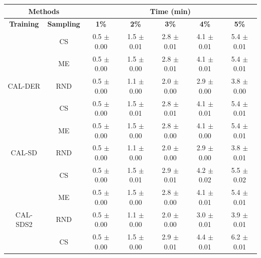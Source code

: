 \begin{table}[htbp]
\centering

\begin{tabular*}{\linewidth}{c|c|@{\extracolsep{\fill}}ccccc}
\toprule
\multicolumn{2}{c|}{\textbf{Methods}} & \multicolumn{5}{c}{\textbf{Time (min)}} \\
\midrule
\textbf{Training} & \textbf{Sampling} & \textbf{1\%} & \textbf{2\%} & \textbf{3\%} & \textbf{4\%} & \textbf{5\%}\\
\midrule
 & CS & 0.5 $\pm$ {\small 0.00} & 1.5 $\pm$ {\small 0.01} & 2.8 $\pm$ {\small 0.01} & 4.1 $\pm$ {\small 0.01} & 5.4 $\pm$ {\small 0.01}\\

 & ME & 0.5 $\pm$ {\small 0.00} & 1.5 $\pm$ {\small 0.00} & 2.8 $\pm$ {\small 0.01} & 4.1 $\pm$ {\small 0.01} & 5.4 $\pm$ {\small 0.01}\\

\multirow{-3}{*}{\raggedright\arraybackslash CAL-DER} & RND & 0.5 $\pm$ {\small 0.00} & 1.1 $\pm$ {\small 0.00} & 2.0 $\pm$ {\small 0.00} & 2.9 $\pm$ {\small 0.00} & 3.8 $\pm$ {\small 0.00}\\
\midrule
 & CS & 0.5 $\pm$ {\small 0.00} & 1.5 $\pm$ {\small 0.01} & 2.8 $\pm$ {\small 0.01} & 4.1 $\pm$ {\small 0.01} & 5.4 $\pm$ {\small 0.01}\\

 & ME & 0.5 $\pm$ {\small 0.00} & 1.5 $\pm$ {\small 0.00} & 2.8 $\pm$ {\small 0.00} & 4.1 $\pm$ {\small 0.00} & 5.4 $\pm$ {\small 0.01}\\

\multirow{-3}{*}{\raggedright\arraybackslash CAL-SD} & RND & 0.5 $\pm$ {\small 0.00} & 1.1 $\pm$ {\small 0.00} & 2.0 $\pm$ {\small 0.00} & 2.9 $\pm$ {\small 0.00} & 3.8 $\pm$ {\small 0.01}\\
\midrule
 & CS & 0.5 $\pm$ {\small 0.00} & 1.5 $\pm$ {\small 0.01} & 2.9 $\pm$ {\small 0.01} & 4.2 $\pm$ {\small 0.02} & 5.5 $\pm$ {\small 0.02}\\

 & ME & 0.5 $\pm$ {\small 0.00} & 1.5 $\pm$ {\small 0.00} & 2.8 $\pm$ {\small 0.00} & 4.1 $\pm$ {\small 0.01} & 5.4 $\pm$ {\small 0.01}\\

\multirow{-3}{*}{\raggedright\arraybackslash CAL-SDS2} & RND & 0.5 $\pm$ {\small 0.00} & 1.1 $\pm$ {\small 0.00} & 2.0 $\pm$ {\small 0.00} & 3.0 $\pm$ {\small 0.01} & 3.9 $\pm$ {\small 0.01}\\
\midrule
 & CS & 0.5 $\pm$ {\small 0.00} & 1.5 $\pm$ {\small 0.00} & 2.9 $\pm$ {\small 0.01} & 4.4 $\pm$ {\small 0.01} & 6.2 $\pm$ {\small 0.01}\\


\end{tabular*}
\end{table}
